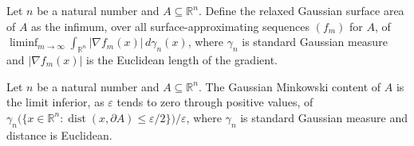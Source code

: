 \begin{definition}
\label{BooleanAnalysis.GaussianSpace.relaxedGaussianSurfaceArea}
\leanok
{}
Let $n$ be a natural number and $A\subseteq\mathbb{R}^n$. Define the relaxed Gaussian
surface area of $A$ as the infimum, over all surface-approximating sequences $(f_m)$ for
$A$, of $\liminf_{m\to\infty}\int_{\mathbb{R}^n}|\nabla f_m(x)|\,d\gamma_n(x)$, where
$\gamma_n$ is standard Gaussian measure and $|\nabla f_m(x)|$ is the Euclidean length of
the gradient.
\end{definition}

\begin{definition}
\label{BooleanAnalysis.GaussianSpace.gaussianMinkowskiContent}
\leanok
{}
Let $n$ be a natural number and $A\subseteq\mathbb{R}^n$. The Gaussian Minkowski content
of $A$ is the limit inferior, as $\varepsilon$ tends to zero through positive values, of
$\gamma_n\bigl(\{x\in\mathbb{R}^n:\operatorname{dist}(x,\partial
A)\leq\varepsilon/2\}\bigr)/\varepsilon$, where $\gamma_n$ is standard Gaussian measure
and distance is Euclidean.
\end{definition}

